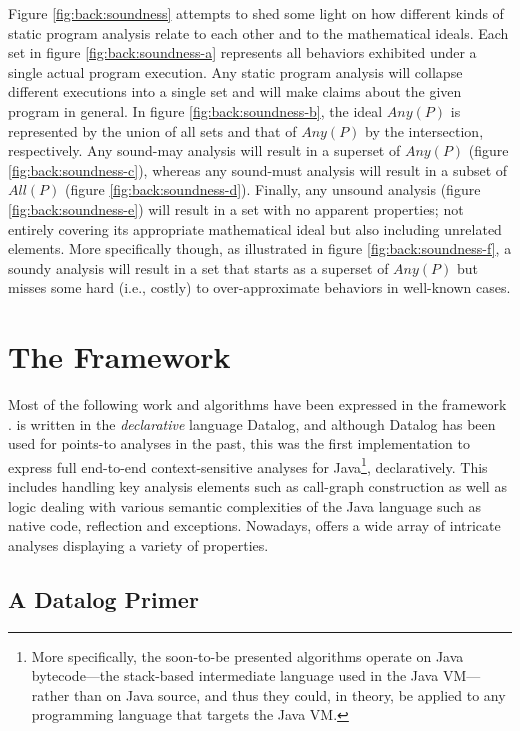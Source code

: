 Figure \ref{fig:back:soundness} attempts to shed some light on how different kinds of static program analysis relate to each other and to the mathematical ideals. Each set in figure \ref{fig:back:soundness-a} represents all behaviors exhibited under a single actual program execution. Any static program analysis will collapse different executions into a single set and will make claims about the given program in general. In figure \ref{fig:back:soundness-b}, the ideal $Any(P)$ is represented by the union of all sets and that of $Any(P)$ by the intersection, respectively. Any sound-may analysis will result in a superset of $Any(P)$ (figure \ref{fig:back:soundness-c}), whereas any sound-must analysis will result in a subset of $All(P)$ (figure \ref{fig:back:soundness-d}). Finally, any unsound analysis (figure \ref{fig:back:soundness-e}) will result in a set with no apparent properties; not entirely covering its appropriate mathematical ideal but also including unrelated elements. More specifically though, as illustrated in figure \ref{fig:back:soundness-f}, a soundy analysis will result in a set that starts as a superset of $Any(P)$ but misses some hard (i.e., costly) to over-approximate behaviors in well-known cases.


\section{The \doop{} Framework}
\label{sec:back:doop}

Most of the following work and algorithms have been expressed in the \doop{} framework \cite{oopsla:2009:Bravenboer}. \doop{} is written in the \emph{declarative} language Datalog, and although Datalog has been used for points-to analyses in the past, this was the first implementation to express full end-to-end context-sensitive analyses for Java\footnote{More specifically, the soon-to-be presented algorithms operate on Java bytecode---the stack-based intermediate language used in the Java VM---rather than on Java source, and thus they could, in theory, be applied to any programming language that targets the Java VM.}, declaratively. This includes handling key analysis elements such as call-graph construction as well as logic dealing with various semantic complexities of the Java language such as native code, reflection and exceptions. Nowadays, \doop{} offers a wide array of intricate analyses displaying a variety of properties.

\subsection*{A Datalog Primer}
\label{sec:back:datalog}

